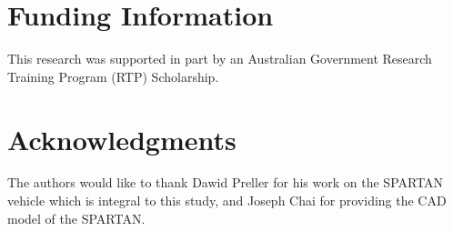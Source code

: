 \documentclass[journal]{new-aiaa}
\begin{document}
 
\section*{Funding Information}
This research was supported in part by an Australian Government Research Training Program (RTP) Scholarship.

\section*{Acknowledgments}

The authors would like to thank Dawid Preller for his work on the SPARTAN vehicle which is integral to this study, and Joseph Chai for providing the CAD model of the SPARTAN.

\footnotesize

%

\end{document}
